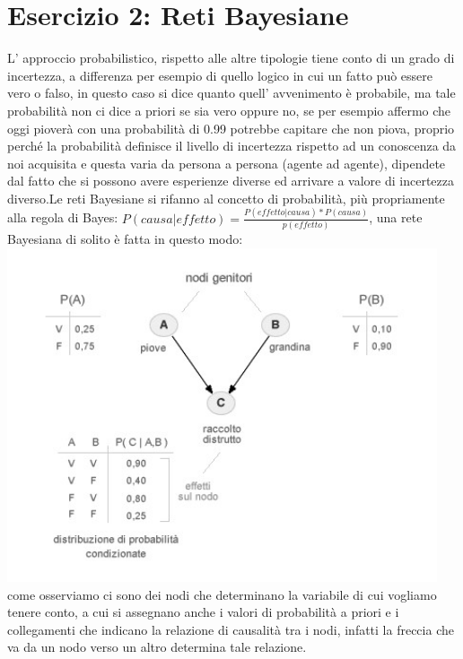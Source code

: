 		\section{Esercizio 2: Reti Bayesiane}
		\label{sec:es2}
		L' approccio probabilistico, rispetto alle altre tipologie tiene conto di un grado di incertezza, a differenza per esempio di quello logico in cui un fatto può essere vero o falso, in questo caso si dice quanto quell' avvenimento è probabile, ma tale probabilità non ci dice a priori se sia vero oppure no, se per esempio affermo che oggi pioverà con una probabilità di 0.99 potrebbe capitare che non piova, proprio perché la probabilità definisce il livello di incertezza rispetto ad un conoscenza da noi acquisita e questa varia da persona a persona (agente ad agente), dipendete dal fatto che si possono avere esperienze diverse ed arrivare a valore di incertezza diverso.Le reti Bayesiane si rifanno al concetto di probabilità, più propriamente alla regola di Bayes: $P(causa|effetto)=\frac{P(effetto|causa)*P(causa)}{p(effetto)}$, una rete Bayesiana di solito è fatta in questo modo:
		\includegraphics[width=0.95\textwidth, height=0.40\textheight]{retebayesiana.jpg}
		come osserviamo ci sono dei nodi che determinano la variabile di cui vogliamo tenere conto, a cui si assegnano anche i valori di probabilità a priori e i collegamenti che indicano la relazione di causalità tra i nodi, infatti la freccia che va da un nodo verso un altro determina tale relazione.
		\par 
